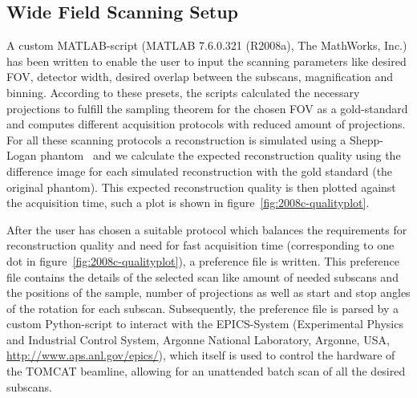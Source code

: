 \subsection{Wide Field Scanning Setup}
\cbstart
A custom MATLAB-script (MATLAB\textsuperscript{\textregistered} 7.6.0.321 (R2008a), The MathWorks, Inc.) has been written to enable the user to input the scanning parameters like desired FOV, detector width, desired overlap between the subscans, magnification and binning. According to these presets, the scripts calculated the necessary projections to fulfill the sampling theorem for the chosen FOV as a gold-standard and computes different acquisition protocols with reduced amount of projections. For all these scanning protocols a reconstruction is simulated using a Shepp-Logan phantom~\cite{Shepp1974} and we calculate the expected reconstruction quality using the difference image for each simulated reconstruction with the gold standard (the original phantom). This expected reconstruction quality is then plotted against the acquisition time, such a plot is shown in figure~\ref{fig:2008c-qualityplot}.

After the user has chosen a suitable protocol which balances the requirements for reconstruction quality and need for fast acquisition time (corresponding to one dot in figure~\ref{fig:2008c-qualityplot}), a preference file is written. This preference file contains the details of the selected scan like amount of needed subscans and the positions of the sample, number of projections as well as start and stop angles of the rotation for each subscan. Subsequently, the preference file is parsed by a custom Python-script to interact with the EPICS-System (Experimental Physics and Industrial Control System, Argonne National Laboratory, Argonne, USA, \url{http://www.aps.anl.gov/epics/}), which itself is used to control the hardware of the TOMCAT beamline, allowing for an unattended batch scan of all the desired subscans.
\cbend

\begin{figure*}
	\centering
	\caption[Quality-Plot of 34 calculated protocols]{Quality-Plot of 34 calculated protocols. The red dots show the expected quality of the different protocols, the black plot is a polynomial fit $p(x)$ with $n=4$ for $p(x)=p_{1}x^{n}+p_{2}x^{n-1}+\cdots+p_{n}x+p_{n+1}$. A subset of 19 protocols have been scanned. Details of these scans are shown in table~\ref{tab:projections} and are discussed in section~\ref{sec:Results}.}%
	\label{fig:2008c-qualityplot}%
\end{figure*}

